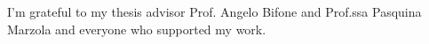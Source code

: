 I'm grateful to my thesis advisor Prof. Angelo Bifone and Prof.ssa Pasquina Marzola and everyone who supported my work.
